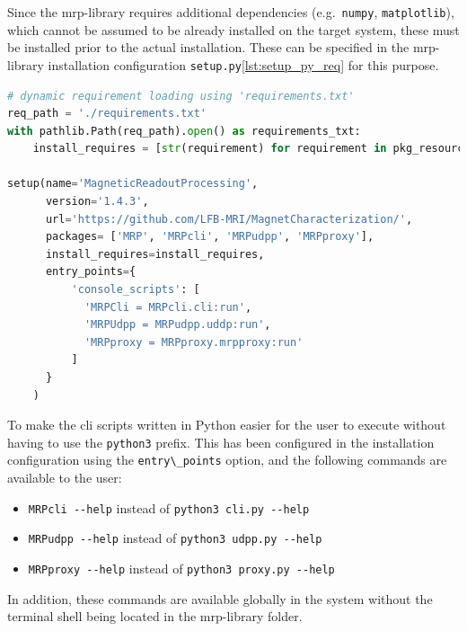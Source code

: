 Since the \gls{mrp}-library requires additional dependencies
(e.g.~\passthrough{\lstinline!numpy!},
\passthrough{\lstinline!matplotlib!}), which cannot be assumed to be
already installed on the target system, these must be installed prior to
the actual installation. These can be specified in the \gls{mrp}-library
installation configuration
\passthrough{\lstinline!setup.py!}\ref{lst:setup_py_req} for this
purpose.

\begin{lstlisting}[language=Python, caption={setup.py with dynamic requirement parsing used given requirements.txt}, label=lst:setup_py_req]
# dynamic requirement loading using 'requirements.txt'
req_path = './requirements.txt'
with pathlib.Path(req_path).open() as requirements_txt:
    install_requires = [str(requirement) for requirement in pkg_resources.parse_requirements(requirements_txt)]

setup(name='MagneticReadoutProcessing',
      version='1.4.3',
      url='https://github.com/LFB-MRI/MagnetCharacterization/',
      packages= ['MRP', 'MRPcli', 'MRPudpp', 'MRPproxy'],
      install_requires=install_requires,
      entry_points={
          'console_scripts': [
            'MRPCli = MRPcli.cli:run',
            'MRPUdpp = MRPudpp.uddp:run',
            'MRPproxy = MRPproxy.mrpproxy:run'
          ]
      }
    )
\end{lstlisting}

To make the \gls{cli} scripts written in Python easier for the user to
execute without having to use the \passthrough{\lstinline!python3!}
prefix. This has been configured in the installation configuration using
the \passthrough{\lstinline!entry\_points!} option, and the following
commands are available to the user:

\begin{itemize}
\tightlist
\item
  \passthrough{\lstinline!MRPcli --help!} instead of
  \passthrough{\lstinline!python3 cli.py --help!}
\item
  \passthrough{\lstinline!MRPudpp --help!} instead of
  \passthrough{\lstinline!python3 udpp.py --help!}
\item
  \passthrough{\lstinline!MRPproxy --help!} instead of
  \passthrough{\lstinline!python3 proxy.py --help!}
\end{itemize}

In addition, these commands are available globally in the system without
the terminal shell being located in the \gls{mrp}-library folder.

